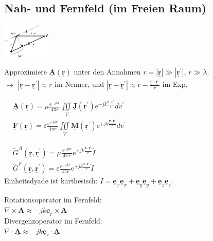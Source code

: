 \documentclass[english]{latex4ei/latex4ei_sheet}
\renewcommand{\vec}[1]{\underline{\boldsymbol{#1}}}
\begin{document}
\begin{sectionbox}
    \subsection{Nah- und Fernfeld (im Freien Raum)}

    \begin{center}\includegraphics[width = 2.3cm]{./img/fernfeld.png}\end{center}

    Approximiere $\vec{A}(\vec{r})$ unter den Annahmen $r = |\vec{r}|\gg |\vec{r}^{\prime}|$, $r \gg \lambda$.\\
    $\rightarrow$ $|\vec{r} - \vec{r}^{\prime}| \approx r$ im Nenner, und $|\vec{r} - \vec{r}^{\prime}| \approx r - \frac{\vec{r}\cdot\vec{r}^{\prime}}{r}$ im Exp.\\

    \begin{emphbox}
        $\begin{aligned}
                 & \vec{A}(\vec{r})=\mu \frac{\mathrm{e}^{-j k r}}{4 \pi r} \iiint\limits_{V} \vec{J}\left(\vec{r}^{\prime}\right) \mathrm{e}^{+j k \frac{\vec{r}\cdot \vec{r}^{\prime}}{r} } d v^{\prime}         \\
                 & \vec{F}(\vec{r})=\varepsilon \frac{\mathrm{e}^{-j k r}}{4 \pi r} \iiint\limits_{V} \vec{M}\left(\vec{r}^{\prime}\right) \mathrm{e}^{+j k \frac{\vec{r}\cdot \vec{r}^{\prime} }{r}} d v^{\prime}
            \end{aligned}$
    \end{emphbox}
    \begin{emphbox}
        $\begin{aligned}
                 & \overleftrightarrow{G}^A(\vec{r}, \vec{r}^\prime)=\mu \frac{\mathrm{e}^{-j k r}}{4 \pi r} \mathrm{e}^{+j k \frac{\vec{r}\cdot \vec{r}^{\prime}}{r} } \overleftrightarrow{I}         \\
                 & \overleftrightarrow{G}^F(\vec{r}, \vec{r}^\prime)=\varepsilon \frac{\mathrm{e}^{-j k r}}{4 \pi r} \mathrm{e}^{+j k \frac{\vec{r}\cdot \vec{r}^{\prime}}{r} } \overleftrightarrow{I}
            \end{aligned}$\\
        \vspace{1em}
        Einheitsdyade ist karthesisch: $\overleftrightarrow{I} = \vec{e}_x\vec{e}_x + \vec{e}_y\vec{e}_y + \vec{e}_z\vec{e}_z$.
    \end{emphbox}
    \begin{emphbox}
        Rotationsoperator im Fernfeld:\\
        $\nabla \times \vec{A} \approx -jk \vec{e}_r \times \vec{A}$\\
        Divergenzoperator im Fernfeld:\\
        $\nabla \cdot \vec{A} \approx -jk \vec{e}_r \cdot \vec{A}$\\
    \end{emphbox}
\end{sectionbox}
\end{document}
